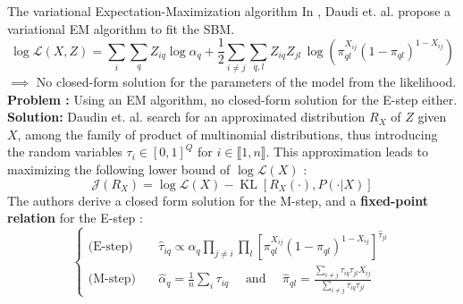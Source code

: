 \documentclass[final]{beamer}
\newlength{\colwidth}
\DeclareMathOperator*{\KL}{KL}
\begin{document}
\begin{frame}[t]
\begin{columns}[t]
\begin{column}{\colwidth}
      \begin{alertblock}{The variational Expectation-Maximization algorithm}
        In \cite{main_article}, Daudi et. al. propose a variational EM algorithm to fit the SBM.
        \begin{equation*}
          \log \mathcal{L}(X, Z) =  \sum_{i}\sum_{q} Z_{iq}\log\alpha_q + \frac{1}{2}\sum_{i\neq j}\sum_{q,l} Z_{iq}Z_{jl} \, \log\left( \pi_{ql}^{X_{ij}}\left(1-\pi_{ql}\right)^{1-X_{ij}} \right)
        \end{equation*}
        $\implies$ No closed-form solution for the parameters of the model from the likelihood.
        \newline
        \textbf{Problem :} Using an EM algorithm, no closed-form solution for the E-step either. %
        \newline
        \textbf{Solution: }Daudin et. al. search for an approximated distribution $R_X$ of $Z$ given $X$, among the family of product of multinomial distributions, thus introducing the random variables $\tau_i\in [0,1]^Q$ for $i\in \llbracket 1,n \rrbracket$. This approximation leads to maximizing the following lower bound of $\log \mathcal{L}(X)$ :
        \begin{equation*}
          \label{eq:lower_bound}
          \mathcal{J}(R_X)=\log \mathcal{L}(X)-\KL[R_X(\cdot), P(\cdot|X)]
        \end{equation*}
        The authors derive a closed form solution for the M-step, and a \textbf{fixed-point relation} for the E-step :
        \begin{equation*}
          \begin{cases}
            \text{(E-step)} \quad & \hat{\tau}_{iq}\propto \alpha_q \prod_{j\neq i}\prod_l \left[\pi_{ql}^{X_{ij}}(1-\pi_{ql})^{1-X_{ij}}\right]^{\hat{\tau}_{jl}}                                         \\
            \text{(M-step)} \quad & \hat{\alpha}_q=\frac{1}{n}\sum_{i} \tau_{iq} \quad \text{ and } \quad \hat{\pi}_{ql}=\frac{\sum_{i\neq j} \tau_{iq}\tau_{jl}X_{ij}}{\sum_{i\neq j} \tau_{iq}\tau_{jl}}
          \end{cases}
        \end{equation*}
        \centering
        \begin{minipage}{.9\linewidth}
          \begin{algorithm}[H]
            \caption{Variational Expectation-Maximization Algorithm}
            \label{alg:Daudin-EM}
            \begin{algorithmic}[1]

\end{algorithmic}
\end{algorithm}
\end{minipage}
\end{alertblock}
\end{column}
\end{columns}
\end{frame}
\end{document}
